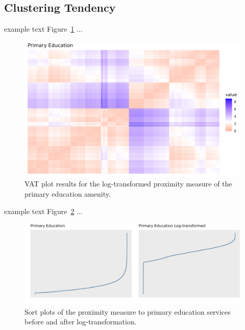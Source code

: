 \documentclass[11pt, a4paper]{article}
\begin{document}
\subsection{Clustering Tendency}

example text Figure~\ref{prieducvat} ...




\begin{figure}[H]
\centering
\includegraphics[width=\textwidth]{./vat/primaryeducation_vat_log.png}
\caption[Primary education VAT plot]{VAT plot results for the log-transformed proximity measure of the primary education amenity.}\label{prieducvat}
\end{figure}










example text Figure~\ref{sortplotcompare} ...




\begin{figure}[H]
\centering
\includegraphics[width=\textwidth]{./sort_plot/sort_comparison.png}
\caption[Primary education sort plot]{Sort plots of the proximity measure to primary education services before and after log-transformation.}\label{sortplotcompare}
\end{figure}
\end{document}

